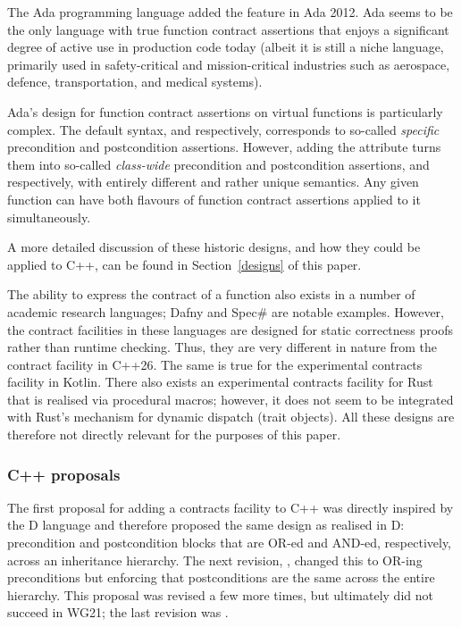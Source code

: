 The Ada programming language added the feature in Ada 2012. Ada seems to be the only language with true function contract assertions that enjoys a significant degree of active use in production code today (albeit it is still a niche language, primarily used in safety-critical and mission-critical industries such as aerospace, defence, transportation, and medical systems).

Ada's design for function contract assertions on virtual functions is particularly complex. The default syntax,  and  respectively, corresponds to so-called \emph{specific} precondition and postcondition assertions. However, adding the  attribute turns them into so-called  \emph{class-wide} precondition and postcondition assertions,  and  respectively, with entirely different and rather unique semantics. Any given function can have both flavours of function contract assertions applied to it simultaneously.

A more detailed discussion of these historic designs, and how they could be applied to C++, can be found in Section~\ref{designs} of this paper.

The ability to express the contract of a function also exists in a number of academic research languages; Dafny and Spec\# are notable examples. However, the contract facilities in these languages are designed for static correctness proofs rather than runtime checking. Thus, they are very different in nature from the contract facility in C++26. The same is true for the experimental contracts facility in Kotlin. There also exists an experimental contracts facility for Rust that is realised via procedural macros; however, it does not seem to be integrated with Rust's mechanism for dynamic dispatch (trait objects). All these designs are therefore not directly relevant for the purposes of this paper.

\subsubsection{C++ proposals}

The first proposal for adding a contracts facility to C++ \cite{N1613} was directly inspired by the D language and therefore proposed the same design as realised in D: precondition and postcondition blocks that are OR-ed and AND-ed, respectively, across an inheritance hierarchy. The next revision, \cite{N1669}, changed this to OR-ing preconditions but enforcing that postconditions are the same across the entire hierarchy.
This proposal was revised a few more times, but ultimately did not succeed in WG21; the last revision was \cite{N1962}.

